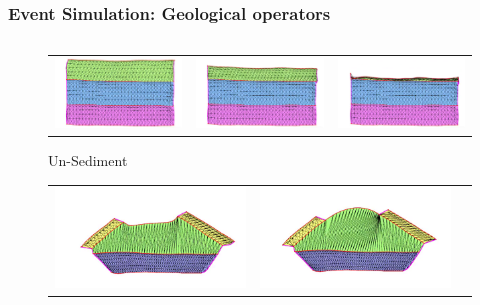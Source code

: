 \documentclass{beamer}
\begin{document}
	\begin{frame}
	\frametitle{Event Simulation: Geological operators}
	\begin{columns}
	\begin{column}{0.55\textwidth}
	\begin{figure}[H]
	\centering
	\begin{tabular}{@{}ccc@{}}
	\includegraphics[width=.41\textwidth]{unSedimentMesh0.png}&
	\includegraphics[width=.41\textwidth]{unSedimentMesh1.png}&
	\includegraphics[width=.41\textwidth]{unSedimentMesh2.png}\\
	\end{tabular}
	\caption{Un-Sediment}
	\label{unsedeg2}
	\end{figure}
	\begin{figure}[H]
	\centering
	\begin{tabular}{@{}ccc@{}}
	\includegraphics[width=.43\textwidth]{unErodeMesh0.png}&
	\includegraphics[width=.43\textwidth]{unErodeMesh1.png}&

\end{tabular}
\end{figure}
\end{column}
\end{columns}
\end{frame}
\end{document}
